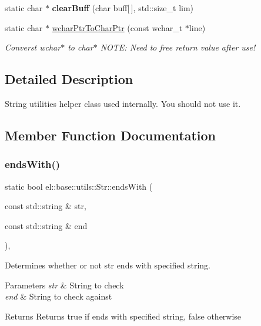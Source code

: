 \begin{DoxyCompactItemize}
static char $\ast$ {\bfseries clear\+Buff} (char buff\mbox{[}$\,$\mbox{]}, std\+::size\+\_\+t lim)
\item 
\mbox{\label{classel_1_1base_1_1utils_1_1_str_a6dc022e7e8d4cbf2c80ba9e1354feaea}} 
static char $\ast$ \hyperlink{classel_1_1base_1_1utils_1_1_str_a6dc022e7e8d4cbf2c80ba9e1354feaea}{wchar\+Ptr\+To\+Char\+Ptr} (const wchar\+\_\+t $\ast$line)
\begin{DoxyCompactList}\small\item\em Converst wchar$\ast$ to char$\ast$ N\+O\+TE\+: Need to free return value after use! \end{DoxyCompactList}\end{DoxyCompactItemize}


\subsection{Detailed Description}
String utilities helper class used internally. You should not use it. 

\subsection{Member Function Documentation}
\mbox{\label{classel_1_1base_1_1utils_1_1_str_a5bcf5f6cc41a7ed683be115148579561}} 
\subsubsection{\texorpdfstring{ends\+With()}{endsWith()}}
{\footnotesize\ttfamily static bool el\+::base\+::utils\+::\+Str\+::ends\+With (\begin{DoxyParamCaption}\item[{const std\+::string \&}]{str,  }\item[{const std\+::string \&}]{end }\end{DoxyParamCaption})\hspace{0.3cm}{\ttfamily [inline]}, {\ttfamily [static]}}



Determines whether or not str ends with specified string. 


\begin{DoxyParams}{Parameters}
{\em str} & String to check \\
\hline
{\em end} & String to check against \\
\hline
\end{DoxyParams}
\begin{DoxyReturn}{Returns}
Returns true if ends with specified string, false otherwise 
\end{DoxyReturn}
\mbox{\label{classel_1_1base_1_1utils_1_1_str_a64b7a841f04ed916ed8d234b8508703e}} 
